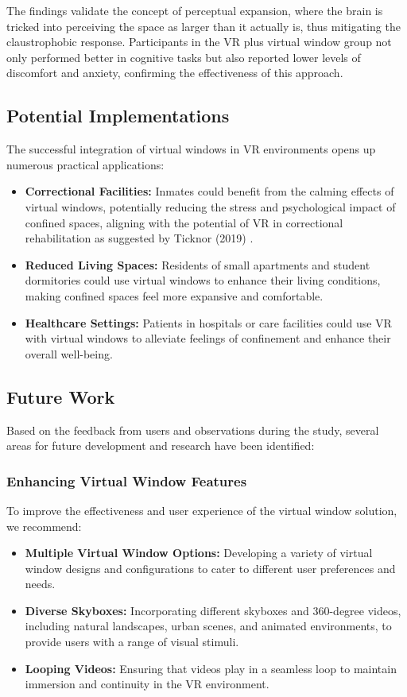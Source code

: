 \documentclass[runningheads]{llncs}
\begin{document}
The findings validate the concept of perceptual expansion, where the brain is tricked into perceiving the space as larger than it actually is, thus mitigating the claustrophobic response. Participants in the VR plus virtual window group not only performed better in cognitive tasks but also reported lower levels of discomfort and anxiety, confirming the effectiveness of this approach.

\subsection{Potential Implementations}

The successful integration of virtual windows in VR environments opens up numerous practical applications:

\begin{itemize}
    \item \textbf{Correctional Facilities:} Inmates could benefit from the calming effects of virtual windows, potentially reducing the stress and psychological impact of confined spaces, aligning with the potential of VR in correctional rehabilitation as suggested by Ticknor (2019) \cite{Ticknor2019}.
    \item \textbf{Reduced Living Spaces:} Residents of small apartments and student dormitories could use virtual windows to enhance their living conditions, making confined spaces feel more expansive and comfortable.
    \item \textbf{Healthcare Settings:} Patients in hospitals or care facilities could use VR with virtual windows to alleviate feelings of confinement and enhance their overall well-being.
\end{itemize}

\subsection{Future Work}

Based on the feedback from users and observations during the study, several areas for future development and research have been identified:

\subsubsection{Enhancing Virtual Window Features}

To improve the effectiveness and user experience of the virtual window solution, we recommend:

\begin{itemize}
    \item \textbf{Multiple Virtual Window Options:} Developing a variety of virtual window designs and configurations to cater to different user preferences and needs.
    \item \textbf{Diverse Skyboxes:} Incorporating different skyboxes and 360-degree videos, including natural landscapes, urban scenes, and animated environments, to provide users with a range of visual stimuli.
    \item \textbf{Looping Videos:} Ensuring that videos play in a seamless loop to maintain immersion and continuity in the VR environment.
\end{itemize}
\end{document}
